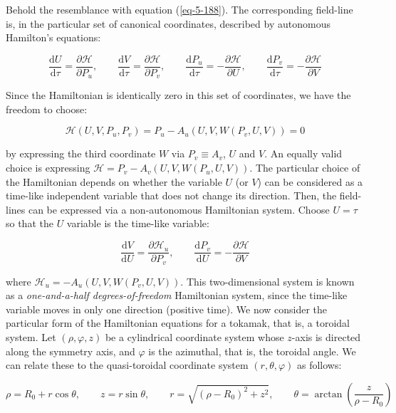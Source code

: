 Behold the resemblance with equation (\ref{eq-5-188}). The corresponding field-line is, in the particular set of canonical coordinates, described by autonomous Hamilton's equations:

\begin{equation}
    \frac{\mathrm{d}U}{\mathrm{d}\tau}=\frac{\partial\mathcal{H}}{\partial P_u},\qquad\frac{\mathrm{d}V}{\mathrm{d}\tau}=\frac{\partial\mathcal{H}}{\partial P_v},\qquad\frac{\mathrm{d}P_u}{\mathrm{d}\tau}=-\frac{\partial\mathcal{H}}{\partial U},\qquad\frac{\mathrm{d}P_v}{\mathrm{d}\tau}=-\frac{\partial\mathcal{H}}{\partial V}
\end{equation}

Since the Hamiltonian is identically zero in this set of coordinates, we have the freedom to choose:

\begin{equation}
    \mathcal{H}(U,V,P_u,P_v)=P_u-A_u(U,V,W(P_v,U,V))=0
\end{equation}

by expressing the third coordinate $W$ via $P_v\equiv A_v$, $U$ and $V$. An equally valid choice is expressing $\mathcal{H}=P_v-A_v(U,V,W(P_u,U,V))$. The particular choice of the Hamiltonian depends on whether the variable $U$ (or $V$) can be considered as a time-like independent variable that does not change its direction. Then, the field-lines can be expressed via a non-autonomous Hamiltonian system. Choose $U=\tau$ so that the $U$ variable is the time-like variable:

\begin{equation}
    \frac{\mathrm{d}V}{\mathrm{d}U}=\frac{\partial\mathcal{H}_u}{\partial P_v},\qquad\frac{\mathrm{d}P_v}{\mathrm{d}U}=-\frac{\partial\mathcal{H}}{\partial V}
\end{equation}

where $\mathcal{H}_u=-A_u(U,V,W(P_v,U,V))$. This two-dimensional system is known as a \textit{one-and-a-half degrees-of-freedom} Hamiltonian system, since the time-like variable moves in only one direction (positive time). We now consider the particular form of the Hamiltonian equations for a tokamak, that is, a toroidal system. Let $(\rho, \varphi, z)$ be a cylindrical coordinate system whose $z$-axis is directed along the symmetry axis, and $\varphi$ is the azimuthal, that is, the toroidal angle. We can relate these to the quasi-toroidal coordinate system $(r,\theta,\varphi)$ as follows:

\begin{equation}
    \rho=R_0+r\cos{\theta},\qquad z=r\sin{\theta},\qquad r=\sqrt{(\rho-R_0)^2+z^2},\qquad\theta=\arctan{\left(\frac{z}{\rho-R_0}\right)}
\end{equation}

